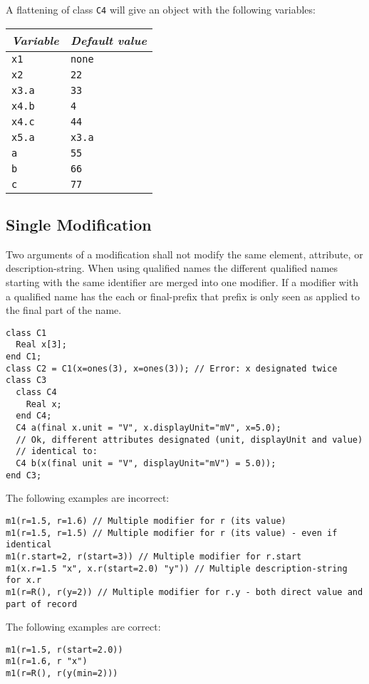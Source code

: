 \begin{example}
A flattening of class \lstinline!C4! will give an object with the following variables:
\begin{longtable}[]{|@{}l|l@{}|}
\hline \endhead
\emph{Variable} & \emph{Default value}\\ \hline
\lstinline!x1! & \lstinline!none!\\ \hline
\lstinline!x2! & \lstinline!22!\\ \hline
\lstinline!x3.a! & \lstinline!33!\\ \hline
\lstinline!x4.b! & \lstinline!4!\\ \hline
\lstinline!x4.c! & \lstinline!44!\\ \hline
\lstinline!x5.a! & \lstinline!x3.a!\\ \hline
\lstinline!a! & \lstinline!55!\\ \hline
\lstinline!b! & \lstinline!66!\\ \hline
\lstinline!c! & \lstinline!77!\\ \hline
\end{longtable}
\end{example}

\subsection{Single Modification}

Two arguments of a modification shall not modify the same element,
attribute, or description-string. When using qualified names the different
qualified names starting with the same identifier are merged into one
modifier. If a modifier with a qualified name has the each or
final-prefix that prefix is only seen as applied to the final part of
the name.

\begin{example}
\begin{lstlisting}[language=modelica]
class C1
  Real x[3];
end C1;
class C2 = C1(x=ones(3), x=ones(3)); // Error: x designated twice
class C3
  class C4
    Real x;
  end C4;
  C4 a(final x.unit = "V", x.displayUnit="mV", x=5.0);
  // Ok, different attributes designated (unit, displayUnit and value)
  // identical to:
  C4 b(x(final unit = "V", displayUnit="mV") = 5.0));
end C3;
\end{lstlisting}

The following examples are incorrect:
\begin{lstlisting}[language=modelica]
m1(r=1.5, r=1.6) // Multiple modifier for r (its value)
m1(r=1.5, r=1.5) // Multiple modifier for r (its value) - even if identical
m1(r.start=2, r(start=3)) // Multiple modifier for r.start
m1(x.r=1.5 "x", x.r(start=2.0) "y")) // Multiple description-string for x.r
m1(r=R(), r(y=2)) // Multiple modifier for r.y - both direct value and part of record
\end{lstlisting}
The following examples are correct:
\begin{lstlisting}[language=modelica]
m1(r=1.5, r(start=2.0))
m1(r=1.6, r "x")
m1(r=R(), r(y(min=2)))
\end{lstlisting}
\end{example}


